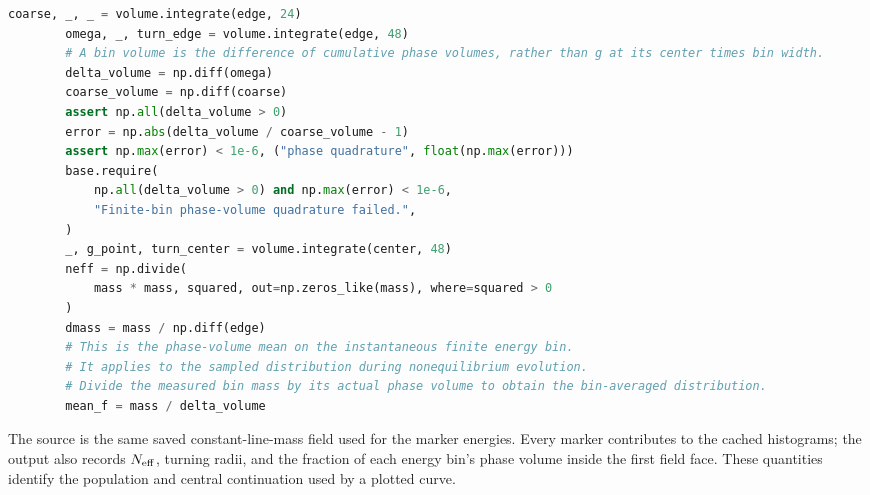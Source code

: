 \begin{lstlisting}[language=Python]
        coarse, _, _ = volume.integrate(edge, 24)
        omega, _, turn_edge = volume.integrate(edge, 48)
        # A bin volume is the difference of cumulative phase volumes, rather than g at its center times bin width.
        delta_volume = np.diff(omega)
        coarse_volume = np.diff(coarse)
        assert np.all(delta_volume > 0)
        error = np.abs(delta_volume / coarse_volume - 1)
        assert np.max(error) < 1e-6, ("phase quadrature", float(np.max(error)))
        base.require(
            np.all(delta_volume > 0) and np.max(error) < 1e-6,
            "Finite-bin phase-volume quadrature failed.",
        )
        _, g_point, turn_center = volume.integrate(center, 48)
        neff = np.divide(
            mass * mass, squared, out=np.zeros_like(mass), where=squared > 0
        )
        dmass = mass / np.diff(edge)
        # This is the phase-volume mean on the instantaneous finite energy bin.
        # It applies to the sampled distribution during nonequilibrium evolution.
        # Divide the measured bin mass by its actual phase volume to obtain the bin-averaged distribution.
        mean_f = mass / delta_volume
\end{lstlisting}
 The source is the same saved constant-line-mass field
used for the marker energies. Every marker contributes to the cached
histograms; the output also records $N_{\rm eff}$, turning radii, and the
fraction of each energy bin's phase volume inside the first field face.
These quantities identify the population and central continuation used
by a plotted curve.

